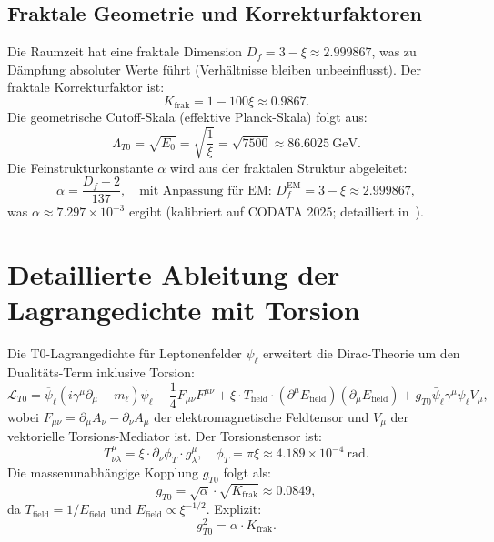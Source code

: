 \documentclass[12pt,a4paper]{article}
\theoremstyle{definition}
\begin{document}
	\subsection{Fraktale Geometrie und Korrekturfaktoren}
	Die Raumzeit hat eine fraktale Dimension $D_f = 3 - \xi \approx 2.999867$, was zu Dämpfung absoluter Werte führt (Verhältnisse bleiben unbeeinflusst). Der fraktale Korrekturfaktor ist:
	\begin{equation}
		K_{\text{frak}} = 1 - 100 \xi \approx 0.9867.
	\end{equation}
	Die geometrische Cutoff-Skala (effektive Planck-Skala) folgt aus:
	\begin{equation}
		\Lambda_{T0} = \sqrt{E_0} = \sqrt{\frac{1}{\xi}} = \sqrt{7500} \approx \SI{86.6025}{\giga\electronvolt}.
	\end{equation}
	Die Feinstrukturkonstante $\alpha$ wird aus der fraktalen Struktur abgeleitet:
	\begin{equation}
		\alpha = \frac{D_f - 2}{137}, \quad \text{mit Anpassung für EM: } D_f^\text{EM} = 3 - \xi \approx 2.999867,
	\end{equation}
	was $\alpha \approx 7.297 \times 10^{-3}$ ergibt (kalibriert auf CODATA 2025; detailliert in~\cite{T0_fine_structure}).
	
	\section{Detaillierte Ableitung der Lagrangedichte mit Torsion}
	Die T0-Lagrangedichte für Leptonenfelder $\psi_\ell$ erweitert die Dirac-Theorie um den Dualitäts-Term inklusive Torsion:
	\begin{equation}
		\mathcal{L}_{T0} = \overline{\psi}_\ell (i \gamma^\mu \partial_\mu - m_\ell) \psi_\ell - \frac{1}{4} F_{\mu\nu} F^{\mu\nu} + \xi \cdot T_{\text{field}} \cdot (\partial^\mu E_{\text{field}}) (\partial_\mu E_{\text{field}}) + g_{T0} \bar{\psi}_\ell \gamma^\mu \psi_\ell V_\mu,
	\end{equation}
	wobei $F_{\mu\nu} = \partial_\mu A_\nu - \partial_\nu A_\mu$ der elektromagnetische Feldtensor und $V_\mu$ der vektorielle Torsions-Mediator ist. Der Torsionstensor ist:
	\begin{equation}
		T^\mu_{\nu\lambda} = \xi \cdot \partial_\nu \phi_T \cdot g_{\lambda}^\mu, \quad \phi_T = \pi \xi \approx 4.189 \times 10^{-4}\ \text{rad}.
	\end{equation}
	Die massenunabhängige Kopplung $g_{T0}$ folgt als:
	\begin{equation}
		g_{T0} = \sqrt{\alpha} \cdot \sqrt{K_{\text{frak}}} \approx 0.0849,
	\end{equation}
	da $T_{\text{field}} = 1 / E_{\text{field}}$ und $E_{\text{field}} \propto \xi^{-1/2}$. Explizit:
	\begin{equation}
		g_{T0}^2 = \alpha \cdot K_{\text{frak}}.
	\end{equation}
	
\end{document}
